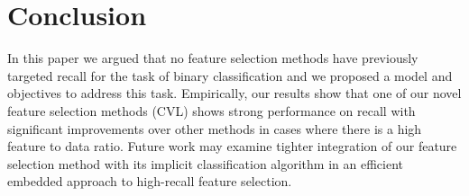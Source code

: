 \section{Conclusion}

In this paper we argued that no feature selection methods have
previously targeted recall for the task of binary classification and
we proposed a model and objectives to address this task.  Empirically,
our results show that one of our novel feature selection methods (CVL)
shows strong performance on recall with significant improvements over
other methods in cases where there is a high feature to data ratio.
Future work may examine tighter integration of our feature selection
method with its implicit classification algorithm in an efficient
embedded approach to high-recall feature selection.

